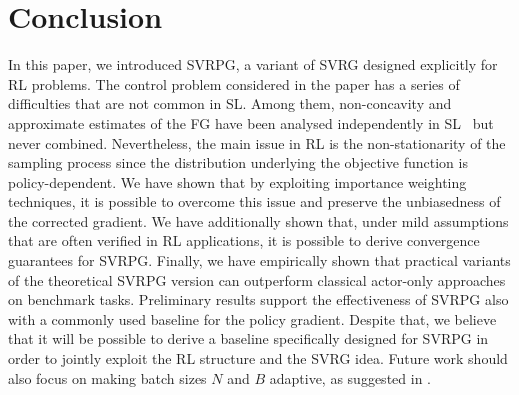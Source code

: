 \documentclass{article}
\makeatletter
\theoremstyle{remark}
\theoremstyle{definition}
\DeclareRobustCommand{\eg}{e.g.,\@\xspace}
\newcommand{\todomatout}[1]{\todo[color=citrine]{\scriptsize #1}}
\makeatother
\begin{document}
\section{Conclusion}
In this paper, we introduced SVRPG, a variant of SVRG designed explicitly for RL problems.
The control problem considered in the paper has a series of difficulties that are not common in SL.
Among them, non-concavity and approximate estimates of the FG have been analysed independently in SL~\citep[\eg][]{allen2016variance,reddi2016stochastic,harikandeh2015stopwasting} but never combined.
Nevertheless, the main issue in RL is the non-stationarity of the sampling process since the distribution underlying the objective function is policy-dependent.
We have shown that by exploiting importance weighting techniques, it is possible to overcome this issue and preserve the unbiasedness of the corrected gradient.
We have additionally shown that, under mild assumptions that are often verified in RL applications, it is possible to derive convergence guarantees for SVRPG.
Finally, we have empirically shown that practical variants of the theoretical SVRPG version can outperform classical actor-only approaches on benchmark tasks.
Preliminary results support the effectiveness of SVRPG also with a commonly used baseline for the policy gradient.
Despite that, we believe that it will be possible to derive a baseline specifically designed for SVRPG in order to jointly exploit the RL structure and the SVRG idea. Future work should also focus on making batch sizes $N$ and $B$ adaptive, as suggested in \cite{papini2017adaptive}.

\FloatBarrier



\clearpage
\onecolumn
\appendix
\end{document}
